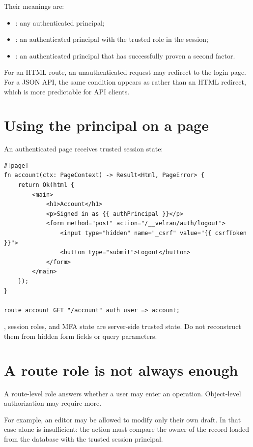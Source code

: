 Their meanings are:

\begin{itemize}
  \item {}: any authenticated principal;
  \item {}: an authenticated principal with the trusted  role in the session;
  \item {}: an authenticated principal that has successfully proven a second factor.
\end{itemize}

For an HTML route, an unauthenticated request may redirect to the login page. For a JSON API, the same condition appears as  rather than an HTML redirect, which is more predictable for API clients.

\section{Using the principal on a page}

An authenticated page receives trusted session state:

\begin{lstlisting}[language=Velran]
#[page]
fn account(ctx: PageContext) -> Result<Html, PageError> {
    return Ok(html {
        <main>
            <h1>Account</h1>
            <p>Signed in as {{ authPrincipal }}</p>
            <form method="post" action="/__velran/auth/logout">
                <input type="hidden" name="_csrf" value="{{ csrfToken }}">
                <button type="submit">Logout</button>
            </form>
        </main>
    });
}

route account GET "/account" auth user => account;
\end{lstlisting}

, session roles, and MFA state are server-side trusted state. Do not reconstruct them from hidden form fields or query parameters.

\section{A route role is not always enough}

A route-level role answers whether a user may enter an operation. Object-level authorization may require more.

For example, an editor may be allowed to modify only their own draft. In that case  alone is insufficient: the action must compare the owner of the record loaded from the database with the trusted session principal.

